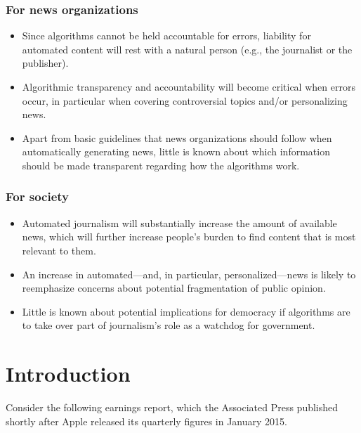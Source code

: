 \documentclass[notoc, symmetric, nobib, nols]{towcenter-guideto-book}
\begin{document}
\subsection{For news organizations}
\begin{itemize}
\item Since algorithms cannot be held accountable for errors, liability for automated content will rest with a natural person (e.g., the journalist or the publisher).
\item Algorithmic transparency and accountability will become critical when errors occur, in particular when covering controversial topics and/or personalizing news.
\item Apart from basic guidelines that news organizations should follow when automatically generating news, little is known about which information should be made transparent regarding how the algorithms work. 
\end{itemize}

\subsection{For society}
\begin{itemize}
\item Automated journalism will substantially increase the amount of available news, which will further increase people's burden to find content that is most relevant to them. 
\item An increase in automated---and, in particular, personalized---news is likely to reemphasize concerns about potential fragmentation of public opinion.
\item Little is known about potential implications for democracy if algorithms are to take over part of journalism's role as a watchdog for government.  
\end{itemize}

\chapter{Introduction}

Consider the following earnings report, which the Associated Press published shortly after Apple released its quarterly figures in January 2015.
\end{document}
